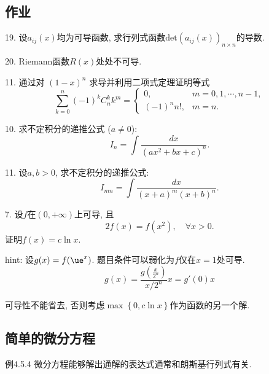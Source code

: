 \subsection{作业}

19. 设$a_{ij}(x)$均为可导函数, 求行列式函数$\mathrm{det}\left(a_{ij}(x)\right)_{n\times n}$的导数.

20. Riemann函数$R(x)$处处不可导.

11. 通过对 $(1-x)^{n}$ 求导并利用二项式定理证明等式 
\[
\sum_{k=0}^{n}(-1)^{k}C_{n}^{k}k^{m}=\begin{cases}
0, & m=0,1,\cdots,n-1,\\
(-1)^{n}n!, & m=n.
\end{cases}
\]

10. 求不定积分的递推公式 ($a\ne0$):
\[
I_{n}=\int\frac{dx}{(ax^{2}+bx+c)^{n}}.
\]

11. 设$a,b>0$, 求不定积分的递推公式:
\[
I_{mn}=\int\frac{dx}{(x+a)^{m}(x+b)^{n}}.
\]

7. 设$f$在$(0,+\infty)$上可导, 且
\[
2f(x)=f(x^{2}),\quad\forall x>0.
\]
证明$f(x)=c\ln x$.

hint: 设$g(x)=f(\ue^{x})$. 题目条件可以弱化为$f$仅在$x=1$处可导. 
\[
g(x)=\frac{g\left(\frac{x}{2^{n}}\right)}{x/2^{n}}x=g'(0)x
\]

可导性不能省去, 否则考虑$\max\left\{ 0,c\ln x\right\} $作为函数的另一个解.

\subsection{简单的微分方程}

例4.5.4 微分方程能够解出通解的表达式通常和朗斯基行列式有关.


